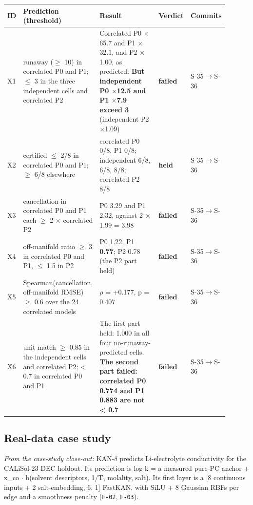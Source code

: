 {\footnotesize\setlength{\tabcolsep}{3pt}
\begin{longtable}{R{0.07\linewidth} R{0.28\linewidth} R{0.35\linewidth} R{0.09\linewidth} R{0.11\linewidth}}
\toprule
ID & Prediction (threshold) & Result & Verdict & Commits \\
\midrule
\endhead
X1 & runaway ($\geq$ 10) in correlated P0 and P1; $\leq$ 3 in the three independent cells and correlated P2 & Correlated P0 $\times$65.7 and P1 $\times$32.1, and P2 $\times$1.00, as predicted. \textbf{But independent P0 $\times$12.5 and P1 $\times$7.9 exceed 3} (independent P2 $\times$1.09) & \textbf{failed} & S-35$\to$\allowbreak S-36 \\
X2 & certified $\leq$ 2/8 in correlated P0 and P1; $\geq$ 6/8 elsewhere & correlated P0 0/8, P1 0/8; independent 6/8, 6/8, 8/8; correlated P2 8/8 & \textbf{held} & S-35$\to$\allowbreak S-36 \\
X3 & cancellation in correlated P0 and P1 each $\geq$ 2 $\times$ correlated P2 & P0 3.29 and P1 2.32, against 2 $\times$ 1.99 = 3.98 & \textbf{failed} & S-35$\to$\allowbreak S-36 \\
X4 & off-manifold ratio $\geq$ 3 in correlated P0 and P1, $\leq$ 1.5 in P2 & P0 1.22, P1 \textbf{0.77}; P2 0.78 (the P2 part held) & \textbf{failed} & S-35$\to$\allowbreak S-36 \\
X5 & Spearman(cancellation, off-manifold RMSE) $\geq$ 0.6 over the 24 correlated models & $\rho$ = +0.177, p = 0.407 & \textbf{failed} & S-35$\to$\allowbreak S-36 \\
X6 & unit match $\geq$ 0.85 in the independent cells and correlated P2; < 0.7 in correlated P0 and P1 & The first part held: 1.000 in all four no-runaway-predicted cells. \textbf{The second part failed: correlated P0 0.774 and P1 0.883 are not < 0.7} & \textbf{failed} & S-35$\to$\allowbreak S-36 \\
\bottomrule
\end{longtable}}
\subsection{Real-data case study}
\noindent\textit{From the case-study close-out:} KAN-$\delta$ predicts Li-electrolyte conductivity for the CALiSol-23 DEC holdout. Its
prediction is log k = a measured pure-PC anchor + x\_co $\cdot$ h(solvent descriptors, 1/T, molality, salt).
Its first layer is a [8 continuous inputs + 2 salt-embedding, 6, 1] FastKAN, with SiLU + 8 Gaussian
RBFs per edge and a smoothness penalty (\texttt{F-02}, \texttt{F-03}).

